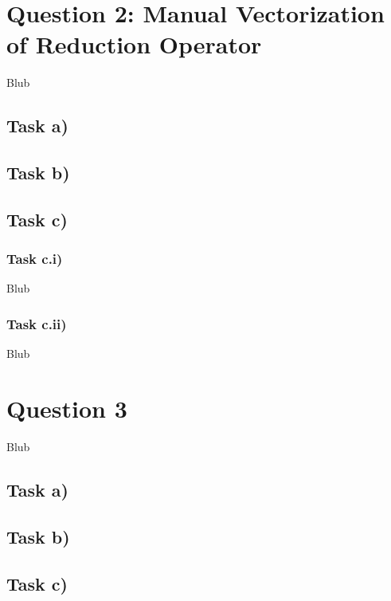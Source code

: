 \documentclass[11pt,a4paper]{article}
\begin{document}
\section{Question 2: Manual Vectorization of Reduction Operator}

Blub

\subsection{Task a)}


\subsection{Task b)}

\subsection{Task c)}

\subsubsection{Task c.i)}
Blub

\subsubsection{Task c.ii)}
Blub



\section{Question 3}

Blub

\subsection{Task a)}


\subsection{Task b)}

\subsection{Task c)}
\end{document}

